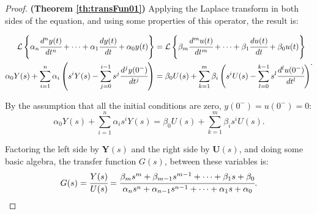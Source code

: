 \documentclass[a4paper,11pt]{book}
\numberwithin{figure}{chapter}
\numberwithin{equation}{chapter}
\numberwithin{table}{chapter}
\theoremstyle{definition}
\begin{document}
\begin{proof}{\textbf{(Theorem \ref{th:transFun01})}}
    Applying the Laplace transform in both sides of the equation, and using some properties of this operator, the result is:

    \begin{equation} 
    \begin{split}
        \mathcal{L} \left\{\alpha_n \cfrac{d^n y(t)}{dt^n} + \cdots + \alpha_{1} \cfrac{d y(t)}{dt} + \alpha_{0} y(t) \right\}  &= \mathcal{L} \left\{ \beta_m \cfrac{d^m u(t)}{dt^m} + \cdots + \beta_{1} \cfrac{d u(t)}{dt} + \beta_{0} u(t) \right \}  \\
        \alpha_0 Y(s) + \sum_{i=1}^{n} \alpha_i \left(s^i Y(s) - \sum^{i-1}_{j = 0} s^j \cfrac{d^j y(0^-)}{dt^j} \right) &= \beta_0 U(s) + \sum_{k=1}^{m} \beta_i \left(s^i U(s) - \sum^{k-1}_{l = 0} s^l \cfrac{d^l u(0^-)}{dt^l} \right)
    \end{split}
    .\end{equation}
    
    By the assumption that all the initial conditions are zero, $y(0^-) = u(0^-) = 0$: 
    \begin{equation} 
        \alpha_0 Y(s) + \sum_{i=1}^{n} \alpha_i s^i Y(s) = \beta_0 U(s) + \sum_{k=1}^{m} \beta_i s^i U(s)
    .\end{equation}
    
    Factoring the left side by $\bm{Y}(s)$ and the right side by $\bm{U}(s)$, and doing some basic algebra, the transfer function $G(s)$, between these variables is:
    \begin{equation} 
     G(s) = \cfrac{Y(s)}{U(s)} = \cfrac{\beta_m s^m + \beta_{m-1} s^{m-1} + \cdots + \beta_{1} s + \beta_0}{\alpha_n s^n + \alpha_{n-1} s^{n-1} + \cdots + \alpha_{1} s + \alpha_0}
    .\end{equation}
\end{proof}

\end{document}
